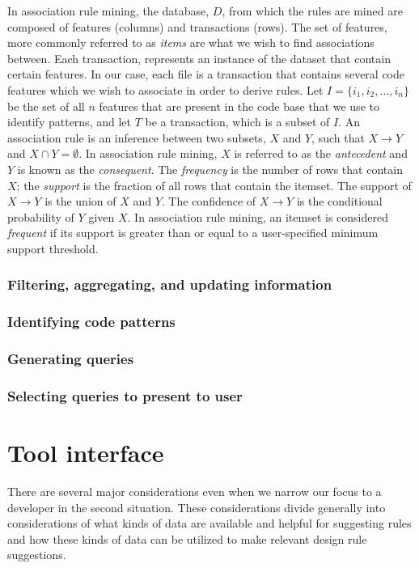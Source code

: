 \documentclass[12pt]{article}
\begin{document}
In association rule mining, the database, $D$, from which the rules are mined are composed of features (columns) and transactions (rows). The set of features, more commonly referred to as \textit{items} are what we wish to find associations between. Each transaction, represents an instance of the dataset that contain certain features. In our case, each file is a transaction that contains several code features which we wish to associate in order to derive rules. Let $I=\{i_1, i_2, \ldots, i_n\}$ be the set of all $n$ features that are present in the code base that we use to identify patterns, and let $T$ be a transaction, which is a subset of $I$. An association rule is an inference between two subsets, $X$ and $Y$, such that $X \rightarrow Y$ and $X \cap Y = \emptyset$. In association rule mining, $X$ is referred to as the \textit{antecedent} and $Y$ is known as the \textit{consequent}. The \textit{frequency} is the number of rows that contain $X$; the \textit{support} is the fraction of all rows that contain the itemset. The support of $X \rightarrow Y$ is the union of $X$ and $Y$. The confidence of $X \rightarrow Y$ is the conditional probability of $Y$ given $X$. In association rule mining, an itemset is considered \textit{frequent} if its support is greater than or equal to a user-specified minimum support threshold. 

\subsubsection{Filtering, aggregating, and updating information}

\subsubsection{Identifying code patterns}

\subsubsection{Generating queries}


\subsubsection{Selecting queries to present to user}

\clearpage


\section{Tool interface} \label{toolInterface}
There are several major considerations even when we narrow our focus to a developer in the second situation. These considerations divide generally into considerations of what kinds of data are available and helpful for suggesting rules and how these kinds of data can be utilized to make relevant design rule suggestions.
\end{document}
